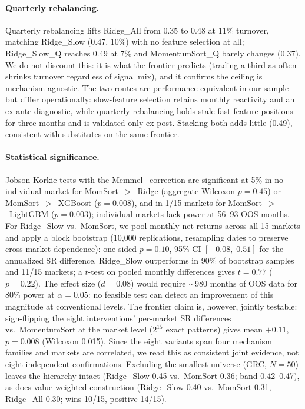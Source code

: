 \documentclass[sigconf,review,anonymous,balance=false]{acmart}
\begin{document}
\paragraph{Quarterly rebalancing.}
Quarterly rebalancing lifts Ridge\_All from 0.35 to 0.48 at 11\%
turnover, matching Ridge\_Slow (0.47, 10\%) with no feature
selection at all; Ridge\_Slow\_Q reaches 0.49 at 7\% and
MomentumSort\_Q barely changes (0.37). We do not discount this: it is
what the frontier predicts (trading a third as often shrinks turnover
regardless of signal mix), and it confirms the ceiling is
mechanism-agnostic. The two routes are performance-equivalent in our
sample but differ operationally: slow-feature selection retains
monthly reactivity and an ex-ante diagnostic, while quarterly
rebalancing holds stale fast-feature positions for three months and
is validated only ex post. Stacking both adds little (0.49),
consistent with substitutes on the same frontier.

\paragraph{Statistical significance.}
Jobson-Korkie tests with the Memmel~\cite{memmel2003performance}
correction are significant at 5\% in no individual market for
MomSort~$>$~Ridge (aggregate Wilcoxon $p = 0.45$) or
MomSort~$>$~XGBoost ($p = 0.008$), and in 1/15 markets for
MomSort~$>$~LightGBM ($p = 0.003$); individual markets lack power at
56--93 OOS months.
For Ridge\_Slow vs.\ MomSort, we pool monthly net returns across all
15 markets and apply a block bootstrap (10{,}000 replications,
resampling dates to preserve cross-market dependence): one-sided
$p = 0.10$, 95\% CI $[-0.08,\; 0.51]$ for the annualized SR
difference. Ridge\_Slow outperforms in 90\% of bootstrap samples and
11/15 markets; a $t$-test on pooled monthly differences gives
$t = 0.77$ ($p = 0.22$). The effect size ($d = 0.08$) would require
${\sim}$980 months of OOS data for 80\% power at $\alpha = 0.05$: no
feasible test can detect an improvement of this magnitude at
conventional levels.
The frontier claim is, however, jointly testable: sign-flipping the
eight interventions' per-market SR differences vs.\ MomentumSort at
the market level ($2^{15}$ exact patterns) gives mean $+0.11$,
$p = 0.008$ (Wilcoxon 0.015). Since the eight variants span four
mechanism families and markets are correlated, we read this as
consistent joint evidence, not eight independent confirmations.
Excluding
the smallest universe (GRC, $N = 50$) leaves the hierarchy intact
(Ridge\_Slow 0.45 vs.\ MomSort 0.36; band 0.42--0.47), as does
value-weighted construction (Ridge\_Slow 0.40 vs.\ MomSort 0.31,
Ridge\_All 0.30; wins 10/15, positive 14/15).
\end{document}

